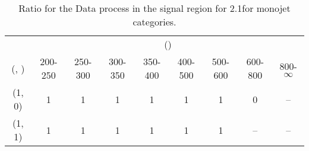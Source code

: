 \begin{table}[h!]
\tiny
\centering
\caption{Ratio for the Data process in the signal region for 2.1\ifb for monojet categories.\label{tab:ratiosep_sig_data_mono}}
\begin{tabular}
{ccccccccc}
	\hline\hline
	& \multicolumn{8}{c}{\scalht (\gev)} \\ 
	 (\njet,  \nb) & 200-250 & 250-300 & 300-350 & 350-400 & 400-500 & 500-600 & 600-800 & 800-$\infty$ \\ [0.8ex] 
\hline
	(1, 0) & 1 & 1 & 1 & 1 & 1 & 1 & 0 & -- \\[0.5ex] 
	(1, 1) & 1 & 1 & 1 & 1 & 1 & 1 & -- & -- \\[0.5ex] 
	\hline
	\hline
\end{tabular}
\end{table}
